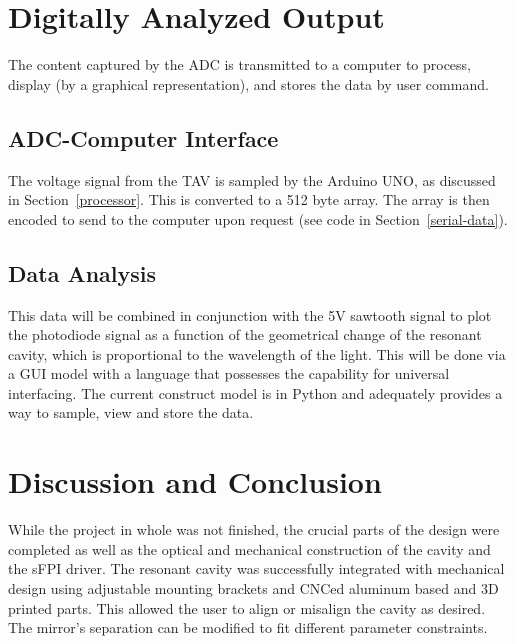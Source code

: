 \documentclass[12pt,journal]{IEEEtran}
\begin{document}

\section{Digitally Analyzed Output}\label{digital-output}

The content captured by the ADC is transmitted to a computer to process, display (by a graphical representation), and stores the data by user command.  


\subsection{ADC-Computer Interface}

The voltage signal from the TAV is sampled by the Arduino UNO, as discussed in Section~\ref{processor}. This is converted to a 512 byte array. The array is then encoded to send to the computer upon request (see code in Section~\ref{serial-data}).


\subsection{Data Analysis}

This data will be combined in conjunction with the 5V sawtooth signal to plot the photodiode signal as a function of the geometrical change of the resonant cavity, which is proportional to the wavelength of the light. This will be done via a GUI model with a language that possesses the capability for universal interfacing. The current construct model is in Python and adequately provides a way to sample, view and store the data.


\section{Discussion and Conclusion}

While the project in whole was not finished, the crucial parts of the design were completed as well as the optical and mechanical construction of the cavity and the sFPI driver. The resonant cavity was successfully integrated with mechanical design using adjustable mounting brackets and CNCed aluminum based and 3D printed parts. This allowed the user to align or misalign the cavity as desired. The mirror's separation can be modified to fit different parameter constraints. 
\end{document}
